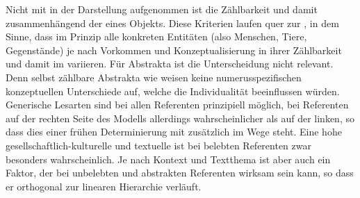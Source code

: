 Nicht mit in der Darstellung aufgenommen ist die Zählbarkeit und damit zusammenhängend der  eines Objekts. Diese Kriterien laufen quer zur , in dem Sinne, dass im Prinzip alle konkreten  Entitäten (also Menschen, Tiere, Gegenstände) je nach Vorkommen und Konzeptualisierung in ihrer Zählbarkeit und damit im  variieren. Für  Abstrakta ist die Unterscheidung nicht relevant. Denn selbst zählbare  Abstrakta wie  weisen keine numerusspezifischen  konzeptuellen Unterschiede auf, welche die Individualität beeinflussen würden. Generische  Lesarten sind bei allen Referenten prinzipiell möglich, bei Referenten auf der rechten Seite des Modells allerdings wahrscheinlicher als auf der linken, so dass dies einer frühen Determinierung mit  zusätzlich im Wege steht. Eine hohe gesellschaftlich-kulturelle und textuelle  ist bei belebten  Referenten zwar besonders wahrscheinlich. Je nach Kontext und Textthema ist  aber auch ein Faktor, der bei unbelebten und  abstrakten Referenten wirksam sein kann, so dass er orthogonal zur linearen Hierarchie verläuft. 

